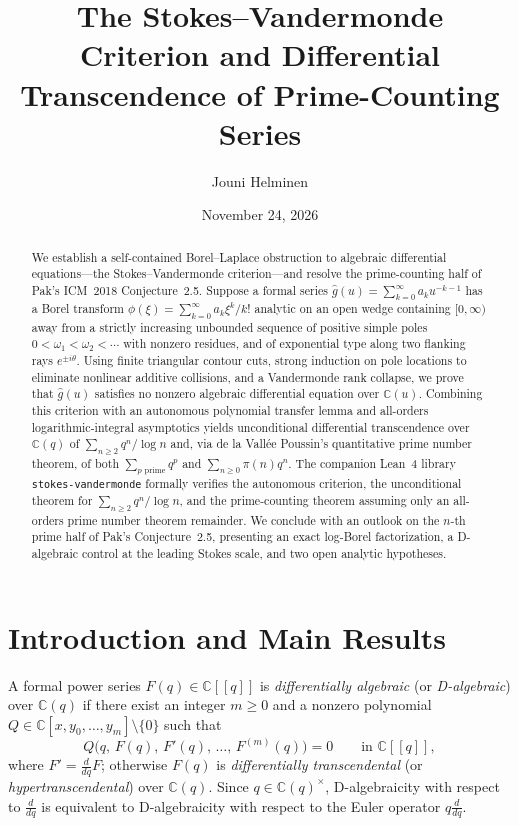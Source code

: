 \documentclass[10pt,reqno]{amsart}
\title[The Stokes--Vandermonde Criterion and Prime-Counting Series]{The Stokes--Vandermonde Criterion and Differential Transcendence of Prime-Counting Series}
\author{Jouni Helminen}
\date{November 24, 2026}
\numberwithin{equation}{section}
\theoremstyle{definition}
\newcommand{\C}{\mathbb{C}}
\begin{document}
\begin{abstract}
We establish a self-contained Borel--Laplace obstruction to algebraic differential equations---the Stokes--Vandermonde criterion---and resolve the prime-counting half of Pak's ICM~2018 Conjecture~2.5. Suppose a formal series $\widehat{g}(u) = \sum_{k=0}^\infty a_k u^{-k-1}$ has a Borel transform $\phi(\xi) = \sum_{k=0}^\infty a_k \xi^k / k!$ analytic on an open wedge containing $[0,\infty)$ away from a strictly increasing unbounded sequence of positive simple poles $0 < \omega_1 < \omega_2 < \cdots$ with nonzero residues, and of exponential type along two flanking rays $e^{\pm i\theta}$. Using finite triangular contour cuts, strong induction on pole locations to eliminate nonlinear additive collisions, and a Vandermonde rank collapse, we prove that $\widehat{g}(u)$ satisfies no nonzero algebraic differential equation over $\mathbb{C}(u)$. Combining this criterion with an autonomous polynomial transfer lemma and all-orders logarithmic-integral asymptotics yields unconditional differential transcendence over $\mathbb{C}(q)$ of $\sum_{n \ge 2} q^n / \log n$ and, via de la Vall\'ee Poussin's quantitative prime number theorem, of both $\sum_{p\text{ prime}} q^p$ and $\sum_{n \ge 0} \pi(n) q^n$. The companion Lean~4 library \texttt{stokes-vandermonde} formally verifies the autonomous criterion, the unconditional theorem for $\sum_{n \ge 2} q^n/\log n$, and the prime-counting theorem assuming only an all-orders prime number theorem remainder. We conclude with an outlook on the $n$-th prime half of Pak's Conjecture~2.5, presenting an exact log-Borel factorization, a D-algebraic control at the leading Stokes scale, and two open analytic hypotheses.
\end{abstract}

\maketitle

\section{Introduction and Main Results}\label{sec:intro}

A formal power series $F(q) \in \C[[q]]$ is \emph{differentially algebraic} (or \emph{D-algebraic}) over $\C(q)$ if there exist an integer $m \ge 0$ and a nonzero polynomial $Q \in \C[x, y_0, \dots, y_m] \setminus \{0\}$ such that
\[
  Q\bigl(q,\, F(q),\, F'(q),\, \dots,\, F^{(m)}(q)\bigr) = 0 \qquad \text{in } \C[[q]],
\]
where $F' = \frac{d}{dq} F$; otherwise $F(q)$ is \emph{differentially transcendental} (or \emph{hypertranscendental}) over $\C(q)$. Since $q \in \C(q)^\times$, D-algebraicity with respect to $\frac{d}{dq}$ is equivalent to D-algebraicity with respect to the Euler operator $q\frac{d}{dq}$.
\end{document}
